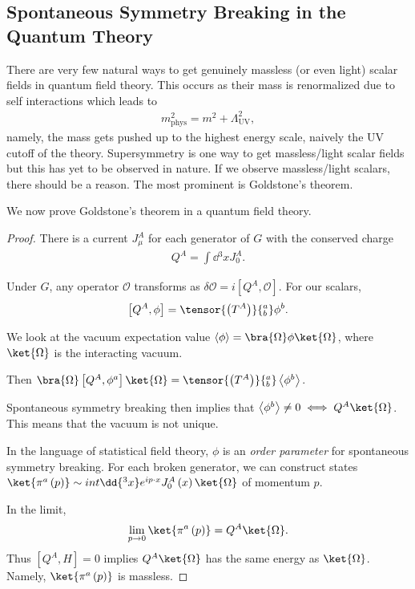 \subsection{Spontaneous Symmetry Breaking in the Quantum Theory}

There are very few natural ways to get genuinely massless (or even light) scalar fields in quantum field theory. This occurs as their mass is renormalized due to self interactions which leads to
\begin{align}
    m_\text{phys}^2 = m^2 + \Lambda_\text{UV}^2
,\end{align}
namely, the mass gets pushed up to the highest energy scale, naively the UV cutoff of the theory. Supersymmetry is one way to get massless/light scalar fields but this has yet to be observed in nature. If we observe massless/light scalars, there should be a reason. The most prominent is Goldstone's theorem.

We now prove Goldstone's theorem in a quantum field theory.

\begin{proof}
    There is a current $J^{A}_\mu$ for each generator of $G$ with the conserved charge
    \begin{align}
        Q^{A} = \int \dd{^3 x} J_0^{A}
    .\end{align}

    Under $G$, any operator $\mathcal{O}$ transforms as $\delta \mathcal{O} = i \left[ Q^{A}, \mathcal{O} \right] $. For our scalars,
    \begin{align}
        \left[ Q^{A}, \phi \right] = \tensor{\left( T^{A} \right)}{^{a}_b} \phi^{b}
    .\end{align}

    We look at the vacuum expectation value $\left<\phi \right> = \bra{\Omega} \phi \ket{\Omega}$, where $\ket{\Omega}$ is the interacting vacuum.

    Then $\bra{\Omega} \left[ Q^{A}, \phi^{a} \right] \ket{\Omega} = \tensor{\left( T^{A} \right)}{^{a}_b} \left<\phi^{b} \right> $.

    Spontaneous symmetry breaking then implies that $\left<\phi^{b} \right> \neq 0 \iff Q^{A} \ket{\Omega}$. This means that the vacuum is not unique.

    In the language of statistical field theory, $\phi$ is an \emph{order parameter}  for spontaneous symmetry breaking. For each broken generator, we can construct states $\ket{\pi^{a}\left( p \right) } \sim  int \dd{^3 x} e^{i p \cdot x} J_0^{A}\left( x \right) \ket{\Omega}$ of momentum $p$.

    In the limit,
    \begin{align}
        \lim_{p \to 0} \ket{\pi^{a}\left( p \right) } = Q^{A} \ket{\Omega}
    .\end{align}
    Thus $\left[ Q^{A}, H \right] = 0$ implies $Q^{A} \ket{\Omega}$ has the same energy as $\ket{\Omega}$. Namely, $\ket{\pi^{a}\left( p \right) }$ is massless.
\end{proof}


